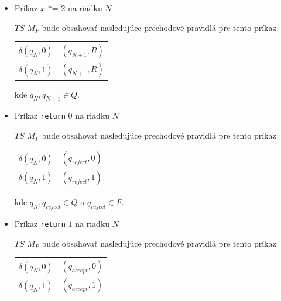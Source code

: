 \documentclass[11pt,a4paper]{article}
\begin{document}
\begin{itemize}
    \item Príkaz $x \texttt{ *= } 2$ na riadku $N$\\[-1.5em]
        \begin{flushright}
        \begin{minipage}{0.90\textwidth}
            $TS$ $M_P$ bude obsahovať nasledujúce prechodové pravidlá pre tento príkaz
            \begin{center}
            \begin{tabular}{r@{ $=$ }l}
                $\delta(q_{N}, 0)$ & $(q_{N+1}, R)$\\
                $\delta(q_{N}, 1)$ & $(q_{N+1}, R)$
            \end{tabular}
            \end{center}
            kde $q_{N}, q_{N+1} \in Q$.
        \end{minipage}
        \end{flushright}
    \item Príkaz \texttt{return} $0$ na riadku $N$\\[-1.5em]
        \begin{flushright}
        \begin{minipage}{0.90\textwidth}
            $TS$ $M_P$ bude obsahovať nasledujúce prechodové pravidlá pre tento príkaz
            \begin{center}
            \begin{tabular}{r@{ $=$ }l}
                $\delta(q_{N}, 0)$ & $(q_{reject}, 0)$\\
                $\delta(q_{N}, 1)$ & $(q_{reject}, 1)$
            \end{tabular}
            \end{center}
            kde $q_{N}, q_{reject} \in Q$ a $q_{reject} \in F$.
        \end{minipage}
        \end{flushright}
    \item Príkaz \texttt{return} $1$ na riadku $N$\\[-1.5em]
        \begin{flushright}
        \begin{minipage}{0.90\textwidth}
            $TS$ $M_P$ bude obsahovať nasledujúce prechodové pravidlá pre tento príkaz
            \begin{center}
            \begin{tabular}{r@{ $=$ }l}
                $\delta(q_{N}, 0)$ & $(q_{accept}, 0)$\\
                $\delta(q_{N}, 1)$ & $(q_{accept}, 1)$

\end{tabular}
\end{center}
\end{minipage}
\end{flushright}
\end{itemize}
\end{document}

